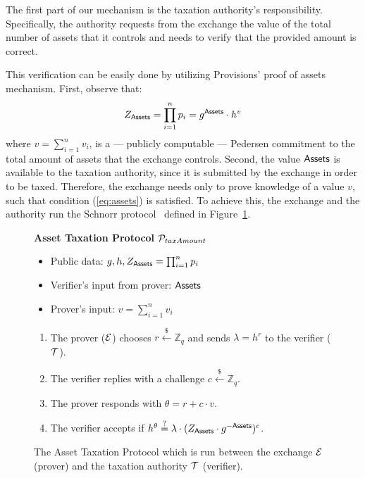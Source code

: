The first part of our mechanism is the taxation authority's responsibility.
Specifically, the authority requests from the exchange the value of the total
number of assets that it controls and needs to verify that the provided amount
is correct.

This verification can be easily done by utilizing Provisions' proof of
assets mechanism. First, observe that:
\begin{align}
    Z_{\mathsf{Assets}} = \prod_{i = 1}^n p_i = g^{\mathsf{Assets}} \cdot h^v \label{eq:assets}
\end{align}
where $v = {\sum_{i = 1}^n v_i}$, is a --- publicly computable --- Pedersen
commitment to the total amount of assets that the exchange controls. Second,
the value $\mathsf{Assets}$ is available to the taxation authority, since it is
submitted by the exchange in order to be taxed.  Therefore, the exchange needs
only to prove knowledge of a value $v$, such that condition (\ref{eq:assets}) is
satisfied. To achieve this, the exchange and the authority run the Schnorr
protocol~\cite{C:Schnorr89} defined in Figure~\ref{fig:taxation_auth_proto}.

\begin{figure}[h]
\begin{mdframed}

\begin{center}
    \textbf{Asset Taxation Protocol} $\mathcal{P}_{taxAmount}$
\end{center}

    \begin{itemize}[$\cdot$]
        \item Public data: $g, h, Z_{\mathsf{Assets}} = \prod_{i = 1}^n p_i$
        \item Verifier's input from prover: $\mathsf{Assets}$
        \item Prover's input: $v = \sum_{i = 1}^n v_i$
    \end{itemize}

    \begin{enumerate}
        \item The prover ($\mathcal{E}$) chooses $r \xleftarrow{\$} \mathbb{Z}_q$
            and sends $\lambda = h^r$ to the verifier ($\mathcal{T}$).
        \item The verifier replies with a challenge $c \xleftarrow{\$} \mathbb{Z}_q$.
        \item The prover responds with $\theta = r + c \cdot v$.
        \item The verifier accepts if $h^\theta \stackrel{?}{=} \lambda \cdot (Z_{\mathsf{Assets}} \cdot g^{-\mathsf{Assets}})^c$.
    \end{enumerate}

\end{mdframed}
\caption{
    The Asset Taxation Protocol which is run between the exchange $\mathcal{E}$
    (prover) and the taxation authority $\mathcal{T}$ (verifier).
}
\label{fig:taxation_auth_proto}
\end{figure}


